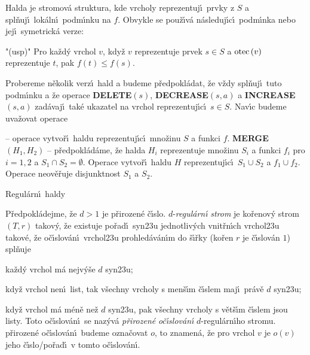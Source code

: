 \flushpar Halda je stromov\'a struktura, kde vrcholy 
reprezentuj\'\i\ prvky z $S$ a spl\v nuj\'\i\ lok\'aln\'\i\ podm\'\i nku na 
$f$. Obvykle se pou\v z\'\i v\'a n\'asleduj\'\i c\'\i\ podm\'\i nka nebo 
jej\'\i\ symetrick\'a verze:
\bigskip
\roster
\item"{(usp)}"
Pro ka\v zd\'y vrchol $v$, kdy\v z $v$ reprezentuje prvek 
$s\in S$ a $\operatorname{otec}\left(v\right)$ reprezentuje $t$, pak $f\left(t\right)\le f\left(s\right)$.
\endroster


\flushpar Probereme n\v ekolik verz\'\i\ hald a budeme 
p\v redpokl\'adat, \v ze v\v zdy spl\v nuj\'\i\ tuto podm\'\i nku a \v ze operace 
{\bf DELETE$\left(s\right)$}, {\bf DECREA\-SE$\left(s,a\right)$} a {\bf INCREASE$\left(s,a\right)$} zad\'avaj\'\i\ 
tak\'e ukazatel na vrchol repre\-zentuj\'\i c\'\i\ $s\in S$.  Nav\'\i c budeme 
uva\v zovat operace
\medskip

 -- operace vytvo\v r\'\i\ haldu 
reprezentuj\'\i c\'\i\ mno\v zinu $S$ a funkci $f$.\newline 
{\bf MERGE$\left(H_1,H_2\right)$} -- p\v redpokl\'ad\'ame, \v ze halda $H_i$ reprezentuje 
mno\v zinu $S_i$ a funkci $f_i$ pro $i=1,2$ a $S_1\cap S_2=\emptyset$. Operace 
vytvo\v r\'\i\ haldu $H$ reprezentuj\'\i c\'\i\ $S_1\cup S_2$ a $
f_1\cup f_2$. 
Operace neov\v e\v ruje disjunktnost $S_1$ a $S_2$.
\medskip

\heading
Regul\'arn\'\i\ haldy
\endheading

\flushpar P\v redpokl\'adejme, \v ze $d>1$ je p\v rirozen\'e \v c\'\i slo. 
$d$-\emph{regul\'arn\'\i} \emph{strom} je ko\v renov\'y strom 
$\left(T,r\right)$ takov\'y, \v ze existuje po\v rad\'\i\ syn\accent23u 
jednotliv\'ych vnit\v rn\'\i ch vrchol\accent23u takov\'e, \v ze 
o\v c\'\i slov\'an\'\i\ vrchol\accent23u pro\-hle\-d\'a\-v\'an\'\i m do \v s\'\i\v rky 
(ko\v ren $r$ je \v c\'\i slov\'an $1$) spl\v nuje 
\roster
\item
ka\v zd\'y vrchol m\'a nejv\'y\v se $d$ syn\accent23u;
\item
kdy\v z vrchol nen\'\i\ list, tak v\v sechny vrcholy s men\v s\'\i m 
\v c\'\i slem maj\'\i\ pr\'av\v e $d$ syn\accent23u;
\item
kdy\v z vrchol m\'a m\'en\v e ne\v z $d$ syn\accent23u, pak v\v sechny 
vrcholy s v\v et\v s\'\i m \v c\'\i slem jsou listy.
\endroster
Toto o\v c\'\i slov\'an\'\i\ se naz\'yv\'a \emph{p\v rirozen\'e} 
\emph{o\v c\'\i slov\'an\'\i} $d$-regul\'arn\'\i ho stromu. p\v rirozen\'e o\v c\'\i slov\'an\'\i\ 
budeme ozna\v covat $o$, to znamen\'a, \v ze pro vrchol $v$ je $o
\left(v\right)$ jeho 
\v c\'\i slo/po\v rad\'\i\ v tomto o\v c\'\i slov\'an\'\i.


